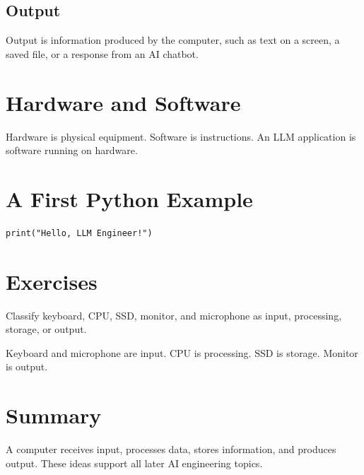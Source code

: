 \subsection{Output}Output is information produced by the computer, such as text on a screen, a saved file, or a response from an AI chatbot.
\section{Hardware and Software}
Hardware is physical equipment. Software is instructions. An LLM application is software running on hardware.
\section{A First Python Example}
\begin{lstlisting}
print("Hello, LLM Engineer!")
\end{lstlisting}
\section{Exercises}
\begin{exercise}Classify keyboard, CPU, SSD, monitor, and microphone as input, processing, storage, or output.\end{exercise}
\begin{solution}Keyboard and microphone are input. CPU is processing. SSD is storage. Monitor is output.\end{solution}
\section{Summary}A computer receives input, processes data, stores information, and produces output. These ideas support all later AI engineering topics.
